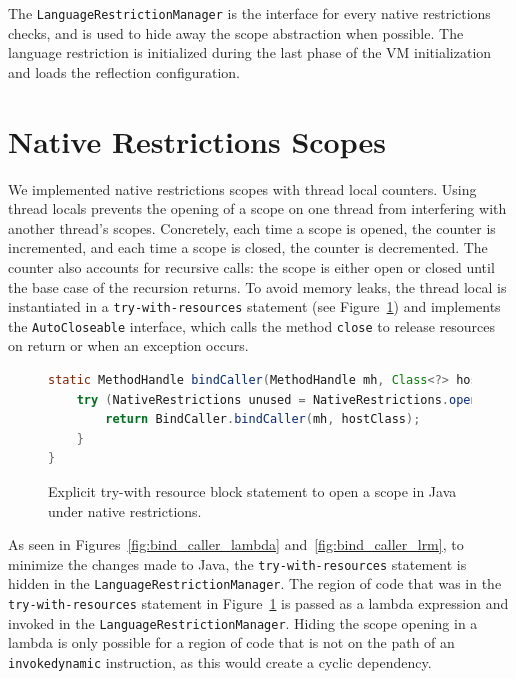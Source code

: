 The \verb|LanguageRestrictionManager| is the interface for every native restrictions checks, and is used to hide away the scope abstraction when possible.
The language restriction is initialized during the last phase of the VM initialization and loads the reflection configuration.
\section{Native Restrictions Scopes}
We implemented native restrictions scopes with thread local counters. Using thread locals prevents the opening of a scope on one thread from interfering with another thread's scopes.
Concretely, each time a scope is opened, the counter is incremented, and each time a scope is closed, the counter is decremented. The counter also accounts for recursive calls: the scope is either open or closed until the base case of the recursion returns.
To avoid memory leaks, the thread local is instantiated in a \verb|try-with-resources| statement (see Figure~\ref{fig:bind_caller_twr}) and implements the \verb|AutoCloseable| interface, which calls the method \verb|close| to release resources on return or when an exception occurs.

\begin{figure}[ht]
    \centering
\begin{lstlisting}[language=Java]
static MethodHandle bindCaller(MethodHandle mh, Class<?> hostClass) {
    try (NativeRestrictions unused = NativeRestrictions.openScope()) {
        return BindCaller.bindCaller(mh, hostClass);
    }
}
\end{lstlisting}
    \caption{Explicit try-with resource block statement to open a scope in Java under native restrictions.}
    \label{fig:bind_caller_twr}
\end{figure}

As seen in Figures~\ref{fig:bind_caller_lambda} and~\ref{fig:bind_caller_lrm}, to minimize the changes made to Java, the \verb|try-with-resources| statement is hidden in the \verb|LanguageRestrictionManager|. The region of code that was in the \verb|try-with-resources| statement in Figure~\ref{fig:bind_caller_twr} is passed as a lambda expression and invoked in the \verb|LanguageRestrictionManager|. Hiding the scope opening in a lambda is only possible for a region of code that is not on the path of an \verb|invokedynamic| instruction, as this would create a cyclic dependency. 

